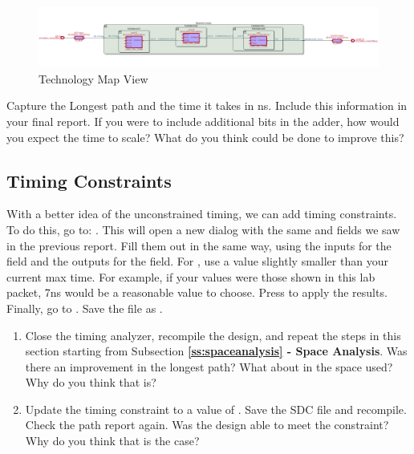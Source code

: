 \documentclass[12pt]{labmanual}
\begin{document}
\begin{figure}
    \centering
    \includegraphics[width=\linewidth]{techmap.png}
    \caption{Technology Map View}
    \label{fig:techmap}
\end{figure}
\hfill\break
\begin{question}
    Capture the Longest path and the time it takes in ns. Include this information in your final report. If you were to include additional bits in the adder, how would you expect the time to scale? What do you think could be done to improve this?
\end{question}
\clearpage
\subsection{Timing Constraints}
With a better idea of the unconstrained timing, we can add timing constraints. To do this, go to: . This will open a new dialog with the same  and  fields we saw in the previous report. Fill them out in the same way, using the inputs for the  field and the outputs for the  field. For , use a value slightly smaller than your current max time. For example, if your values were those shown in this lab packet, 7ns would be a reasonable value to choose. Press  to apply the results. Finally, go to . Save the file as .
\hfill\break
\begin{question}[Improvement]
\begin{enumerate}
    \item Close the timing analyzer, recompile the design, and repeat the steps in this section starting from Subsection \textbf{\ref{ss:spaceanalysis} - Space Analysis}. Was there an improvement in the longest path? What about in the space used? Why do you think that is?
    \item Update the timing constraint to a value of . Save the SDC file and recompile. Check the path report again. Was the design able to meet the constraint? Why do you think that is the case?
\end{enumerate}
    
\end{question}
\end{document}
